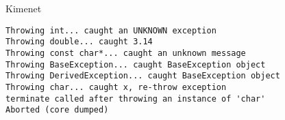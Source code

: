 \documentclass[usenames,dvipsnames,aspectratio=169]{beamer}
\begin{document}
\begin{frame}
    \begin{exampleblock}{}
        \small
        
    \end{exampleblock}
\end{frame}

\begin{frame}
    \begin{exampleblock}{}
        \small
        
    \end{exampleblock}
\end{frame}

\begin{frame}
    \begin{exampleblock}{}
        \small
        
    \end{exampleblock}
\end{frame}

\begin{frame}
    \begin{exampleblock}{}
        \small
        
    \end{exampleblock}
\end{frame}

\begin{frame}[fragile]
    \begin{block}{Kimenet}
        \vspace{-.3cm}
        \begin{verbatim}
Throwing int... caught an UNKNOWN exception
Throwing double... caught 3.14
Throwing const char*... caught an unknown message
Throwing BaseException... caught BaseException object
Throwing DerivedException... caught BaseException object
Throwing char... caught x, re-throw exception
terminate called after throwing an instance of 'char'
Aborted (core dumped)            
\end{verbatim}
    \vspace{-.3cm}
    \end{block}
\end{frame}
\end{document}

